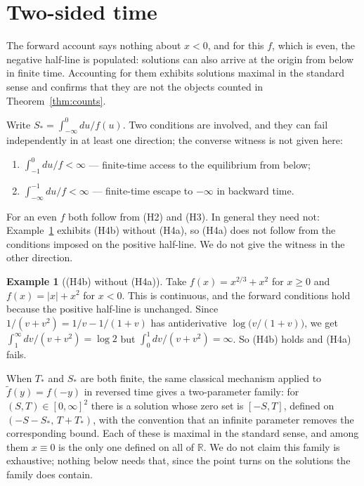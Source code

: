 \documentclass[12pt]{article}
\theoremstyle{plain}
\theoremstyle{definition}
\newtheorem{example}[theorem]{Example}
\theoremstyle{remark}
\newcommand{\R}{\mathbb{R}}
\begin{document}
\appendix

\section{Two-sided time}\label{app:twosided}

The forward account says nothing about $x<0$, and for this $f$, which is even,
the negative half-line is populated: solutions can also arrive at the origin
from below in finite time. Accounting for them exhibits solutions maximal in the
standard sense and confirms that they are not the objects counted in
Theorem~\ref{thm:counts}.

Write $S_{*}=\int_{-\infty}^{0}du/f(u)$. Two conditions are involved, and they
can fail independently in at least one direction; the converse witness is not
given here:
\begin{enumerate}
  \item[(H4a)] $\int_{-1}^{0}du/f<\infty$ --- finite-time access to the
        equilibrium from below;
  \item[(H4b)] $\int_{-\infty}^{-1}du/f<\infty$ --- finite-time escape to
        $-\infty$ in backward time.
\end{enumerate}

For an even $f$ both follow from (H2) and (H3). In general they need not:
Example~\ref{ex:independence} exhibits (H4b) without (H4a), so (H4a) does not
follow from the conditions imposed on the positive half-line. We do not give the
witness in the other direction.

\begin{example}[\textup{(H4b)} without \textup{(H4a)}]\label{ex:independence}
Take $f(x)=x^{2/3}+x^{2}$ for $x\ge0$ and $f(x)=|x|+x^{2}$ for $x<0$. This is
continuous, and the forward conditions hold because the positive half-line is
unchanged. Since $1/(v+v^{2})=1/v-1/(1+v)$ has antiderivative
$\log\!\big(v/(1+v)\big)$, we get $\int_{1}^{\infty}dv/(v+v^{2})=\log 2$ but
$\int_{0}^{1}dv/(v+v^{2})=\infty$. So (H4b) holds and (H4a) fails.
\end{example}

When $T_{*}$ and $S_{*}$ are both finite, the same classical mechanism applied
to $\tilde f(y)=f(-y)$ in reversed time gives a two-parameter family: for
$(S,T)\in[0,\infty]^{2}$ there is a solution whose zero set is $[-S,T]$, defined
on $(-S-S_{*},\,T+T_{*})$, with the convention that an infinite parameter
removes the corresponding bound. Each of these is maximal in the standard sense,
and among them $x\equiv0$ is the only one defined on all of $\R$. We do not
claim this family is exhaustive; nothing below needs that, since the point
turns on the solutions the family does contain.
\end{document}
